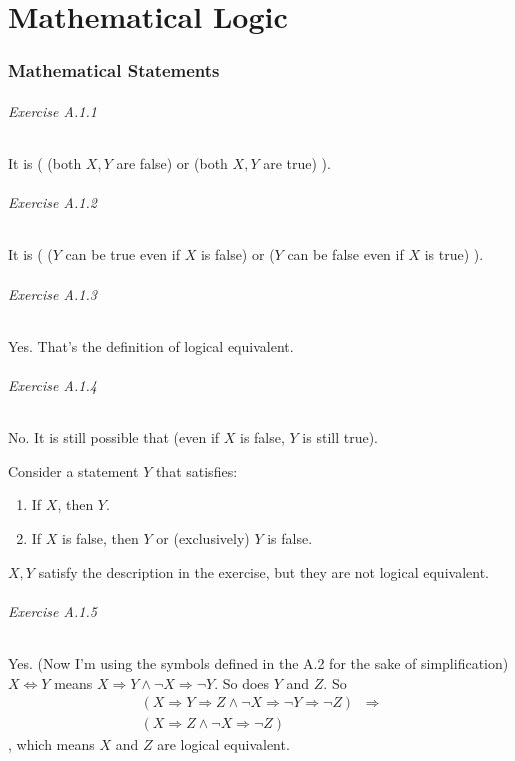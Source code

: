 
\part{Mathematical Logic}

\section{Mathematical Statements}

\paragraph{Exercise A.1.1}
\label{exercisea.1.1}
It is ( (both $X, Y$ are false) or (both $X, Y$ are true) ).

\paragraph{Exercise A.1.2}
\label{exercisea.1.2}
It is ( ($Y$ can be true even if $X$ is false) or ($Y$ can be false even if $X$ is true) ).

\paragraph{Exercise A.1.3}
\label{exercisea.1.3}
Yes. That's the definition of logical equivalent.

\paragraph{Exercise A.1.4}
\label{exercisea.1.4}
No. It is still possible that (even if $X$ is false, $Y$ is still true).

Consider a statement $Y$ that satisfies:
\begin{enumerate}
\item If $X$, then $Y$.
\item If $X$ is false, then $Y$ or (exclusively) $Y$ is false.
\end{enumerate}

$X,Y$ satisfy the description in the exercise, but they are not logical equivalent.

\paragraph{Exercise A.1.5}
\label{exercisea.1.5}
Yes. (Now I'm using the symbols defined in the A.2 for the sake of simplification)
$X \Longleftrightarrow Y$ means $X \Longrightarrow Y \wedge \neg X \Longrightarrow \neg Y$. So does $Y$ and 
$Z$. So 
\begin{align*}
(X \Longrightarrow Y \Longrightarrow Z \wedge \neg X \Longrightarrow \neg Y \Longrightarrow \neg Z)
&\Longrightarrow \\
(X \Longrightarrow Z \wedge \neg X \Longrightarrow \neg Z)
\end{align*}
, which means $X$ and $Z$ are logical equivalent.

